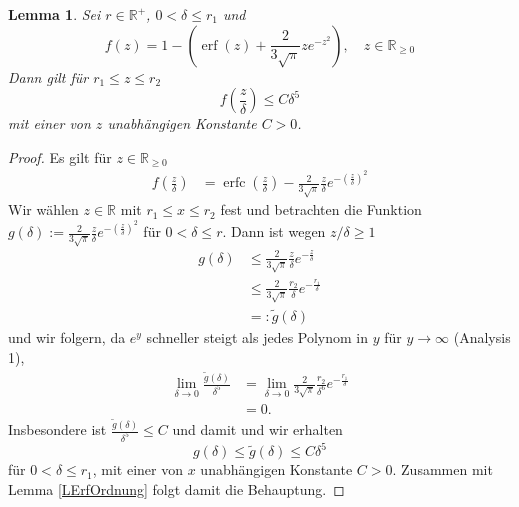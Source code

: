 \documentclass[12pt,a4paper]{scrartcl}
\newtheorem{Lemma}[Satz]{Lemma}
\numberwithin{equation}{section}
\newcommand{\R}{\mathbb{R}} %
\newcommand{\erf}{\operatorname{erf}}
\newcommand{\erfc}{\operatorname{erfc}}
\begin{document}
\begin{Lemma} \label{LErf2Ordnung}
Sei  $r \in \R^+$, $0<\delta \leq r_1$ und
\[ f(z)=
1- \left(\erf(z)+\frac{2}{3\sqrt{\pi}}z e^{-z^2}\right) , \quad z \in \R_{\geq 0}
\]
Dann gilt für $r_1 \leq z \leq r_2$
\[
f \left(\frac{z}{\delta} \right) \leq C \delta^5
\]
mit einer von $z$ unabhängigen Konstante $C>0$.
\end{Lemma}
\begin{proof}
Es gilt für $z \in \R_{\geq 0}$
\begin{align*}
f \left(\frac{z}{\delta} \right) 
&= \erfc \left(\frac{z}{\delta} \right) - \frac{2}{3\sqrt{\pi}}\frac{z}{\delta} e^{-\left(\frac{z}{\delta}\right)^2}
\end{align*}
Wir wählen $z \in \R$ mit $r_1 \leq x \leq r_2$ fest und betrachten die Funktion $g(\delta):=\frac{2}{3\sqrt{\pi}}\frac{z}{\delta} e^{-\left(\frac{z}{\delta}\right)^2}$ für $0 < \delta \leq r$. Dann ist  wegen $z/\delta \geq 1$
\begin{align*}
g(\delta) &\leq \frac{2}{3\sqrt{\pi}}\frac{z}{\delta} e^{-\frac{z}{\delta}} \\
& \leq \frac{2}{3\sqrt{\pi}}\frac{r_2}{\delta} e^{-\frac{r_1}{\delta}} \\
&=: \tilde g(\delta)
\end{align*}
und wir folgern, da $e^y$ schneller steigt als jedes Polynom in $y$ für $y \to \infty$ (Analysis 1),
\begin{align*}
\lim_{\delta \to 0} \frac{\tilde g(\delta)}{\delta^5} &= \lim_{\delta \to 0} \frac{2}{3\sqrt{\pi}}\frac{r_2}{\delta^6} e^{-\frac{r_1}{\delta}} \\
&= 0.
\end{align*}
Insbesondere ist  $\frac{\tilde g(\delta)}{\delta^5} \leq C $ und damit und wir erhalten
\[
g(\delta) \leq \tilde g(\delta) \leq C \delta^5
\] 
für $0 < \delta \leq r_1$, mit einer von $x$ unabhängigen Konstante $C>0$. Zusammen mit Lemma \ref{LErfOrdnung} folgt damit die Behauptung.
\end{proof}
\end{document}
